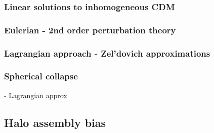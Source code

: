 \documentclass[12pt]{article}
\begin{document}
\subsubsection{Linear solutions to inhomogeneous CDM}
\subsubsection{Eulerian - 2nd order perturbation theory}
\subsubsection{Lagrangian approach - Zel'dovich approximations}
\subsubsection{Spherical collapse}

 - Lagrangian approx\\

\subsection*{Halo assembly bias}
\end{document}
